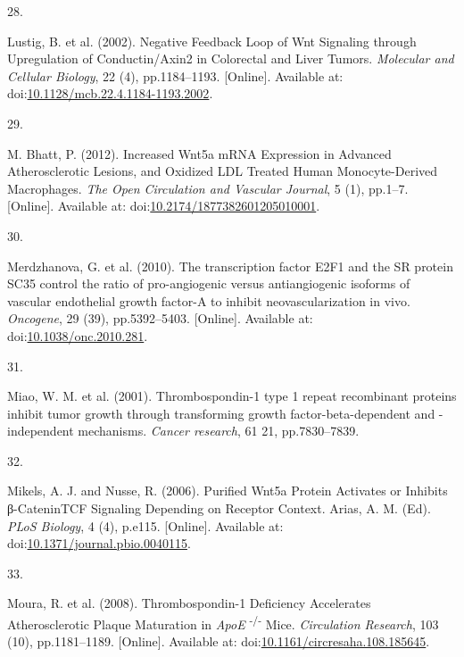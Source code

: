 \documentclass[
  11pt,
]{article}
\newlength{\cslhangindent}
\newlength{\csllabelwidth}
\newlength{\cslentryspacingunit} %
\newenvironment{CSLReferences}[2] %
 {%
  \setlength{\parindent}{0pt}
  \ifodd #1
  \let\oldpar\par
  \def\par{\hangindent=\cslhangindent\oldpar}
  \fi
  \setlength{\parskip}{#2\cslentryspacingunit}
 }%
 {}
\newcommand{\CSLLeftMargin}[1]{\parbox[t]{\csllabelwidth}{#1}}
\newcommand{\CSLRightInline}[1]{\parbox[t]{\linewidth - \csllabelwidth}{#1}\break}
\begin{document}
\begin{CSLReferences}{0}{0}
\leavevmode{}%
\CSLLeftMargin{28. }
\CSLRightInline{Lustig, B. {et al.} (2002). {Negative Feedback Loop of Wnt Signaling through Upregulation of Conductin/Axin2 in Colorectal and Liver Tumors}. \emph{Molecular and Cellular Biology}, 22 (4), pp.1184--1193. {[}Online{]}. Available at: doi:\href{https://doi.org/10.1128/mcb.22.4.1184-1193.2002}{10.1128/mcb.22.4.1184-1193.2002}.}

\leavevmode{}%
\CSLLeftMargin{29. }
\CSLRightInline{M. Bhatt, P. (2012). {Increased Wnt5a mRNA Expression in Advanced Atherosclerotic Lesions, and Oxidized LDL Treated Human Monocyte-Derived Macrophages}. \emph{The Open Circulation and Vascular Journal}, 5 (1), pp.1--7. {[}Online{]}. Available at: doi:\href{https://doi.org/10.2174/1877382601205010001}{10.2174/1877382601205010001}.}

\leavevmode{}%
\CSLLeftMargin{30. }
\CSLRightInline{Merdzhanova, G. {et al.} (2010). {The transcription factor E2F1 and the SR protein SC35 control the ratio of pro-angiogenic versus antiangiogenic isoforms of vascular endothelial growth factor-A to inhibit neovascularization in vivo}. \emph{Oncogene}, 29 (39), pp.5392--5403. {[}Online{]}. Available at: doi:\href{https://doi.org/10.1038/onc.2010.281}{10.1038/onc.2010.281}.}

\leavevmode{}%
\CSLLeftMargin{31. }
\CSLRightInline{Miao, W. M. {et al.} (2001). {Thrombospondin-1 type 1 repeat recombinant proteins inhibit tumor growth through transforming growth factor-beta-dependent and -independent mechanisms.} \emph{Cancer research}, 61 21, pp.7830--7839.}

\leavevmode{}%
\CSLLeftMargin{32. }
\CSLRightInline{Mikels, A. J. and Nusse, R. (2006). {Purified Wnt5a Protein Activates or Inhibits β-Catenin{\textendash}TCF Signaling Depending on Receptor Context}. Arias, A. M. (Ed). \emph{PLoS Biology}, 4 (4), p.e115. {[}Online{]}. Available at: doi:\href{https://doi.org/10.1371/journal.pbio.0040115}{10.1371/journal.pbio.0040115}.}

\leavevmode{}%
\CSLLeftMargin{33. }
\CSLRightInline{Moura, R. {et al.} (2008). {Thrombospondin-1 Deficiency Accelerates Atherosclerotic Plaque Maturation in {\emph{ApoE}} {\textsuperscript{{-}/{-}}} Mice}. \emph{Circulation Research}, 103 (10), pp.1181--1189. {[}Online{]}. Available at: doi:\href{https://doi.org/10.1161/circresaha.108.185645}{10.1161/circresaha.108.185645}.}


\end{CSLReferences}
\end{document}
